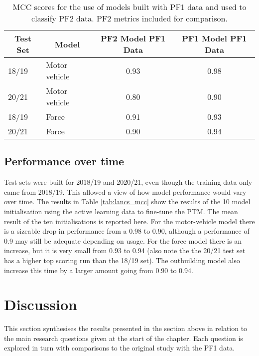 \begin{table}[]
\begin{tabular}{@{}llcc@{}}
\toprule
\multicolumn{1}{c}{Test Set} & \multicolumn{1}{c}{Model} & PF2 Model PF1 Data & PF1 Model PF1 Data \\ \midrule
18/19                        & Motor vehicle             & 0.93                   & 0.98                   \\
20/21                        & Motor vehicle             & 0.80                   & 0.90                   \\
18/19                        & Force                     & 0.91  & 0.93  \\
20/21                        & Force                     & 0.90  & 0.94 \\ \bottomrule
\end{tabular}
\caption[Model metrics. Models tested on alternate police force.]{\label{tab:results_transfer} MCC scores for the use of models built with PF1 data and used to classify PF2 data. PF2 metrics included for comparison. }
\end{table}

\subsection{Performance over time} Test sets were built for 2018/19 and 2020/21, even though the training data only came from 2018/19. This allowed a view of how model performance would vary over time. The results in Table \ref{tab:lancs_mcc} show the results of the 10 model initialisation using the active learning data to fine-tune the PTM. The mean result of the ten initialisations is reported here. For the motor-vehicle model there is a sizeable drop in performance from a 0.98 to 0.90, although a performance of 0.9 may still be adequate depending on usage.  For the force model there is an increase, but it is very small from 0.93 to 0.94 (also note the the 20/21 test set has a higher top scoring run than the 18/19 set). The outbuilding model also increase this time by a larger amount going from 0.90 to 0.94.


\section{Discussion} This section synthesises the results presented in the section above in relation to the main research questions given at the start of the chapter. Each question is explored in turn with comparisons to the original study with the PF1 data.

